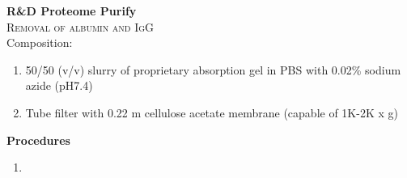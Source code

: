\textbf{R&D Proteome Purify} 
\\
\textsc{Removal of albumin and IgG}
\\
Composition: 
\begin{enumerate}
\item{50/50 (v/v) slurry of proprietary absorption gel in PBS with 0.02\% sodium azide (pH7.4)}
\item{Tube filter with 0.22 \mu m cellulose acetate membrane (capable of 1K-2K x g)}
\end{enumerate}

\textbf{Procedures}
\begin{enumerate}
\item 
\end{enumerate}
